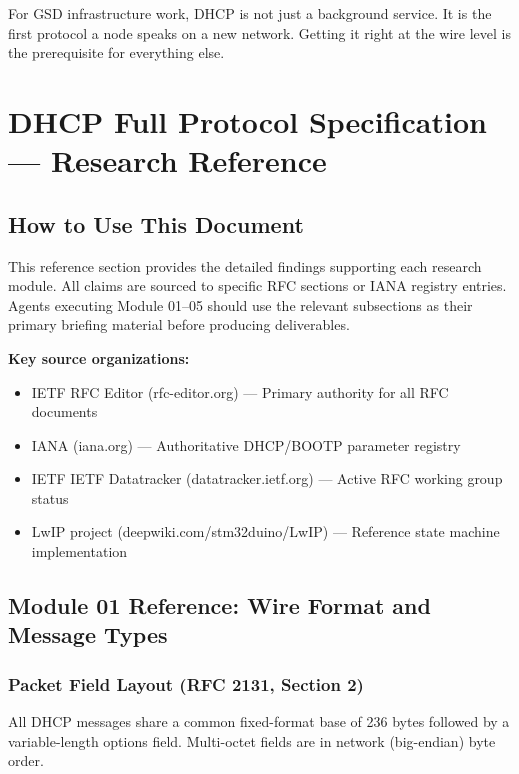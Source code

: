 \documentclass[11pt,letterpaper]{article}
\newcommand{\stageheader}[2]{%
  \noindent\colorbox{#2}{\makebox[\textwidth][l]{%
    \textcolor{white}{\bfseries\sffamily\hspace{6pt}#1\hspace{6pt}}}}%
  \vspace{0.5em}\par%
}
\begin{document}
For GSD infrastructure work, DHCP is not just a background service. It is the first protocol a node speaks on a new network. Getting it right at the wire level is the prerequisite for everything else.

\newpage
\stageheader{STAGE 2 --- RESEARCH REFERENCE}{secondary}

\section{DHCP Full Protocol Specification --- Research Reference}

\subsection{How to Use This Document}

This reference section provides the detailed findings supporting each research module. All claims are sourced to specific RFC sections or IANA registry entries. Agents executing Module 01--05 should use the relevant subsections as their primary briefing material before producing deliverables.

\textbf{Key source organizations:}
\begin{itemize}[noitemsep]
  \item IETF RFC Editor (rfc-editor.org) --- Primary authority for all RFC documents
  \item IANA (iana.org) --- Authoritative DHCP/BOOTP parameter registry
  \item IETF IETF Datatracker (datatracker.ietf.org) --- Active RFC working group status
  \item LwIP project (deepwiki.com/stm32duino/LwIP) --- Reference state machine implementation
\end{itemize}

\subsection{Module 01 Reference: Wire Format and Message Types}

\subsubsection{Packet Field Layout (RFC 2131, Section 2)}

All DHCP messages share a common fixed-format base of 236 bytes followed by a variable-length options field. Multi-octet fields are in network (big-endian) byte order.
\end{document}
